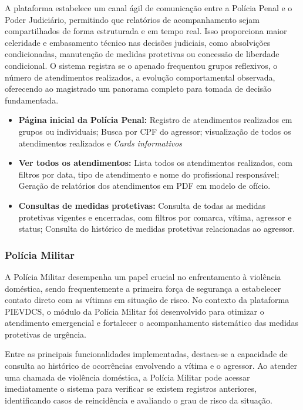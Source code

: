\par A plataforma estabelece um canal ágil de comunicação entre a Polícia Penal e o Poder Judiciário, permitindo que relatórios de acompanhamento sejam compartilhados de forma estruturada e em tempo real. Isso proporciona maior celeridade e embasamento técnico nas decisões judiciais, como absolvições condicionadas, manutenção de medidas protetivas ou concessão de liberdade condicional. O sistema registra se o apenado frequentou grupos reflexivos, o número de atendimentos realizados, a evolução comportamental observada, oferecendo ao magistrado um panorama completo para tomada de decisão fundamentada.

\begin{itemize}
   \item \textbf{Página inicial da Polícia Penal:} Registro de atendimentos realizados em grupos ou individuais; Busca por CPF do agressor; visualização de todos os atendimentos realizados e \textit{Cards informativos}
   \item \textbf{Ver todos os atendimentos:} Lista todos os atendimentos realizados, com filtros por data, tipo de atendimento e nome do profissional responsável; Geração de relatórios dos atendimentos em PDF em modelo de ofício.
   \item \textbf{Consultas de medidas protetivas:} Consulta de todas as medidas protetivas vigentes e encerradas, com filtros por comarca, vítima, agressor e status; Consulta do histórico de medidas protetivas relacionadas ao agressor.
\end{itemize}


\subsubsection{Polícia Militar}
\par A Polícia Militar desempenha um papel crucial no enfrentamento à violência doméstica, sendo frequentemente a primeira força de segurança a estabelecer contato direto com as vítimas em situação de risco. No contexto da plataforma PIEVDCS, o módulo da Polícia Militar foi desenvolvido para otimizar o atendimento emergencial e fortalecer o acompanhamento sistemático das medidas protetivas de urgência.

\par Entre as principais funcionalidades implementadas, destaca-se a capacidade de consulta ao histórico de ocorrências envolvendo a vítima e o agressor. Ao atender uma chamada de violência doméstica, a Polícia Militar pode acessar imediatamente o sistema para verificar se existem registros anteriores, identificando casos de reincidência e avaliando o grau de risco da situação.


